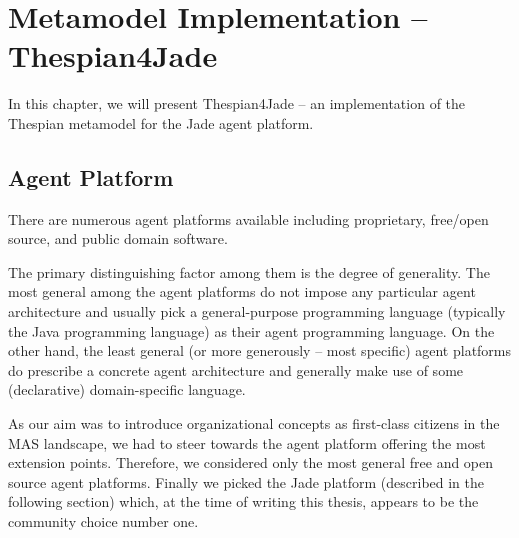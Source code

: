 
\chapter{Metamodel Implementation -- Thespian4Jade}

In this chapter, we will present Thespian4Jade -- an implementation of the Thespian metamodel for the Jade agent platform.

\section{Agent Platform}

There are numerous agent platforms available including proprietary, free/open source, and public domain software.

The primary distinguishing factor among them is the degree of generality.
The most general among the agent platforms do not impose any particular agent architecture and usually pick a general-purpose programming language (typically the Java programming language) as their agent programming language.
On the other hand, the least general (or more generously -- most specific) agent platforms do prescribe a concrete agent architecture and generally make use of some (declarative) domain-specific language.

As our aim was to introduce organizational concepts as first-class citizens in the MAS landscape, we had to steer towards the agent platform offering the most extension points.
Therefore, we considered only the most general free and open source agent platforms.
Finally we picked the Jade platform (described in the following section) which, at the time of writing this thesis, appears to be the community choice number one.  

